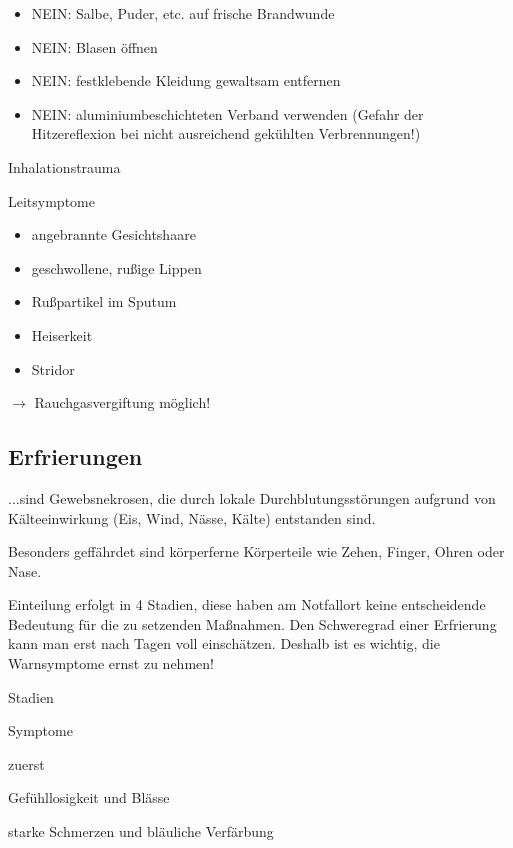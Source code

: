 \documentclass{article}
\begin{document}
\begin{itemize}
\item NEIN: Salbe, Puder, etc. auf frische  Brandwunde

\item NEIN: Blasen \"offnen

\item NEIN: festklebende Kleidung gewaltsam  entfernen

\item NEIN: aluminiumbeschichteten Verband  verwenden (Gefahr der
Hitzereflexion bei  nicht ausreichend gek\"uhlten  Verbrennungen!)

\end{itemize}
%
%
Inhalationstrauma

Leitsymptome

\begin{itemize}
\item angebrannte Gesichtshaare

\item geschwollene, ru{\ss}ige Lippen

\item Ru{\ss}partikel im Sputum

\item Heiserkeit

\item Stridor

\end{itemize}
${\rightarrow}$ Rauchgasvergiftung m\"oglich!

\subsection{Erfrierungen}
...sind Gewebsnekrosen, die durch lokale  Durchblutungsst\"orungen
aufgrund von  K\"alteeinwirkung (Eis, Wind, N\"asse,  K\"alte)
entstanden sind.

Besonders geff\"ahrdet sind k\"orperferne K\"orperteile wie Zehen,
Finger, Ohren oder Nase.

Einteilung erfolgt in 4 Stadien, diese haben am Notfallort keine
entscheidende Bedeutung f\"ur die zu setzenden Ma{\ss}nahmen. Den
Schweregrad einer Erfrierung kann man erst nach Tagen voll
einsch\"atzen. Deshalb ist es wichtig, die Warnsymptome ernst zu
nehmen!

Stadien

Symptome

zuerst 

Gef\"uhllosigkeit und Bl\"asse

starke Schmerzen und bl\"auliche Verf\"arbung
\end{document}
